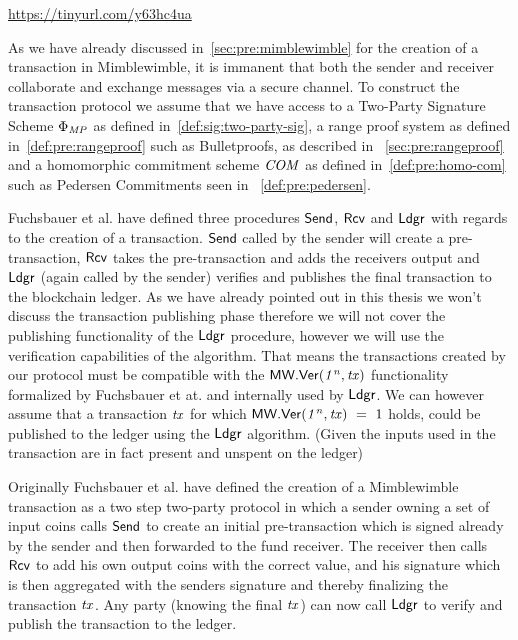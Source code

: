 \urldef\urlgrinexplained\url{https://tinyurl.com/y63hc4ua}

As we have already discussed in~\cref{sec:pre:mimblewimble} for the creation of a transaction in Mimblewimble, it is immanent that both the sender and receiver collaborate and exchange messages via a secure channel.
To construct the transaction protocol we assume that we have access to a Two-Party Signature Scheme $\Phi_{\mathit{MP}}$ as defined in~\cref{def:sig:two-party-sig}, a  range proof system as defined in~\cref{def:pre:rangeproof} such as Bulletproofs, as described in ~\cref{sec:pre:rangeproof} and a homomorphic commitment scheme $\mathit{COM}$ as defined in~\cref{def:pre:homo-com} such as Pedersen Commitments seen in ~\cref{def:pre:pedersen}.

Fuchsbauer et al. have defined three procedures $\mathsf{Send}$, $\mathsf{Rcv}$ and $\mathsf{Ldgr}$ with regards to the creation of a transaction.
$\mathsf{Send}$ called by the sender will create a pre-transaction, $\mathsf{Rcv}$ takes the pre-transaction and adds the receivers output and $\mathsf{Ldgr}$ (again called by the sender) verifies and publishes the final transaction to the blockchain ledger.
As we have already pointed out in this thesis we won't discuss the transaction publishing phase therefore we will not cover the publishing functionality of the $\mathsf{Ldgr}$ procedure, however we will use the verification capabilities of the algorithm.
That means the transactions created by our protocol must be compatible with the $\mathsf{MW.Ver(\mathit{1^n}, \mathit{tx})}$ functionality formalized by Fuchsbauer et at. and internally used by $\mathsf{Ldgr}$.
We can however assume that a transaction $\mathit{tx}$ for which $\mathsf{MW.Ver(\mathit{1^n}, \mathit{tx})} ~=~ 1$ holds, could be published to the ledger using the $\mathsf{Ldgr}$ algorithm. (Given the inputs used in the transaction are in fact present and unspent on the ledger)

Originally Fuchsbauer et al. have defined the creation of a Mimblewimble transaction as a two step two-party protocol in which a sender owning a set of input coins calls $\mathsf{Send}$ to create an initial pre-transaction which is signed already by the sender and then forwarded to the fund receiver.
The receiver then calls $\mathsf{Rcv}$ to add his own output coins with the correct value, and his signature which is then aggregated with the senders signature and thereby finalizing the transaction $\mathit{tx}$.
Any party (knowing the final $\mathit{tx}$) can now call $\mathsf{Ldgr}$ to verify and publish the transaction to the ledger.

